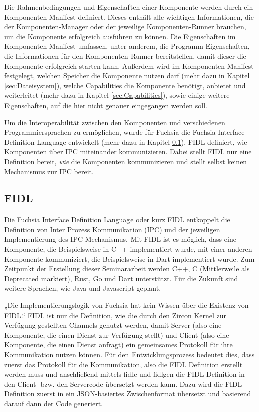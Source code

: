 \documentclass[a4paper]{scrartcl}
\begin{document}
Die Rahmenbedingungen und Eigenschaften einer Komponente werden durch ein Komponenten-Manifest definiert. Dieses enthält alle wichtigen Informationen, die der Komponenten-Manager oder der jeweilige Komponenten-Runner brauchen, um die Komponente erfolgreich ausführen zu können.
Die Eigenschaften im Komponenten-Manifest umfassen, unter anderem, die Programm Eigenschaften, die Informationen für den Komponenten-Runner bereitstellen, damit dieser die Komponente erfolgreich starten kann. Außerdem wird im Komponenten Manifest festgelegt, welchen Speicher die Komponente nutzen darf (mehr dazu in Kapitel \ref{sec:Dateisystem}),  welche Capabilities die Komponente benötigt, anbietet und weiterleitet (mehr dazu in Kapitel \ref{sec:Capabilities}), sowie einige weitere Eigenschaften, auf die hier nicht genauer eingegangen werden soll. \cite{Fuchsia.Components} 

Um die Interoperabilität zwischen den Komponenten und verschiedenen Programmiersprachen zu ermöglichen, wurde für Fuchsia die Fuchsia Interface Definition Language entwickelt (mehr dazu in Kapitel \ref{sec:FIDL}). FIDL definiert, wie Komponenten über IPC miteinander kommunizieren. Dabei stellt FIDL nur eine Definition bereit, \textit{wie} die Komponenten kommunizieren und stellt selbst keinen Mechanismus zur IPC bereit.

\subsection{FIDL}
\label{sec:FIDL}
Die Fuchsia Interface Definition Language oder kurz FIDL entkoppelt die Definition von Inter Prozess Kommunikation (IPC) und der jeweiligen Implementierung des IPC Mechanismus. Mit FIDL ist es möglich, dass eine Komponente, die Beispielsweise in C++ implementiert wurde, mit einer anderen Komponente kommuniziert, die Beispielsweise in Dart implementiert wurde. Zum Zeitpunkt der Erstellung dieser Seminararbeit werden C++, C (Mittlerweile als Deprecated markiert), Rust, Go und Dart unterstützt. Für die Zukunft sind weitere Sprachen, wie Java und Javascript geplant. \cite{Fuchsia.FIDLOverview}

„Die Implementierungslogik von Fuchsia hat kein Wissen über die Existenz von FIDL.“ \cite{Fuchsia.FIDLOverview} FIDL ist nur die Definition, wie die durch den Zircon Kernel zur Verfügung gestellten Channels genutzt werden, damit Server (also eine Komponente, die einen Dienst zur Verfügung stellt) und Client (also eine Komponente, die einen Dienst anfragt) ein gemeinsames Protokoll für ihre Kommunikation nutzen können. Für den Entwicklungsprozess bedeutet dies, dass zuerst das Protokoll für die Kommunikation, also die FIDL Definition erstellt werden muss und anschließend mittels fidlc und fidlgen die FIDL Definition in den Client- bzw. den Servercode übersetzt werden kann. Dazu wird die FIDL Definition zuerst in ein JSON-basiertes Zwischenformat übersetzt und basierend darauf dann der Code generiert.
\end{document}

